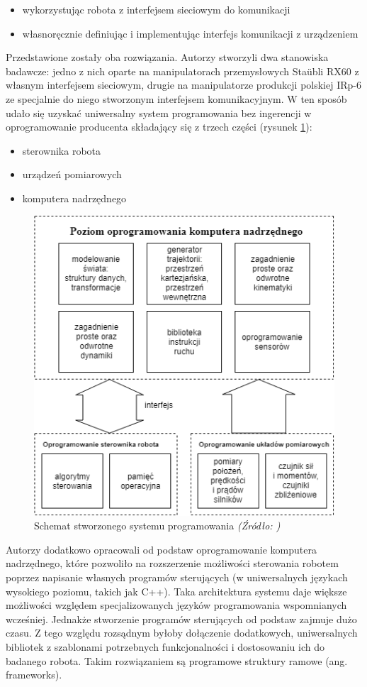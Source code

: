 \documentclass[a4paper, 12pt, twoside]{article}
\begin{document}
\begin{itemize}
\item wykorzystując robota z interfejsem sieciowym do komunikacji
\item własnoręcznie definiując i implementując interfejs komunikacji z urządzeniem
\end{itemize} 

Przedstawione zostały oba rozwiązania. Autorzy stworzyli dwa stanowiska badawcze: jedno z nich oparte na manipulatorach przemysłowych Sta{\"u}bli RX60 z własnym interfejsem sieciowym, drugie na manipulatorze produkcji polskiej IRp-6 ze specjalnie do niego stworzonym interfejsem komunikacyjnym. W ten sposób udało się uzyskać uniwersalny system programowania bez ingerencji w oprogramowanie producenta składający się z trzech części (rysunek \ref{fig:system_scheme}):

\begin{itemize}
\item sterownika robota
\item urządzeń pomiarowych
\item komputera nadrzędnego
\end{itemize}

\begin{figure}[hbt!]
\centering
\includegraphics[width=0.8\linewidth]{images/system_scheme.png}
\caption{Schemat stworzonego systemu programowania\textit{ (Źródło: \cite{systemkozlowski}) } }
\label{fig:system_scheme}
\end{figure}

Autorzy dodatkowo opracowali od podstaw oprogramowanie komputera nadrzędnego, które pozwoliło na rozszerzenie możliwości sterowania robotem poprzez napisanie własnych programów sterujących (w uniwersalnych językach wysokiego poziomu, takich jak C++). Taka architektura systemu daje większe możliwości względem specjalizowanych języków programowania wspomnianych wcześniej. Jednakże stworzenie programów sterujących od podstaw zajmuje dużo czasu. Z tego względu rozsądnym byłoby dołączenie dodatkowych, uniwersalnych bibliotek z szablonami potrzebnych funkcjonalności i dostosowaniu ich do badanego robota. Takim rozwiązaniem są programowe struktury ramowe (ang. frameworks).
\end{document}
